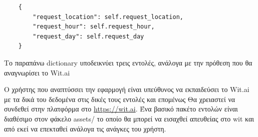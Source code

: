 \begin{lstlisting}
	{
		"request_location": self.request_location,
		"request_hour": self.request_hour,
		"request_day": self.request_day
	}
\end{lstlisting}

Το παραπάνω dictionary υποδεικνύει τρεις εντολές, ανάλογα με την πρόθεση που θα αναγνωρίσει το Wit.ai

Ο χρήστης που αναπτύσσει την εφαρμογή είναι υπεύθυνος να εκπαιδεύσει το Wit.ai με τα δικά του δεδομένα στις δικές τους εντολές και επομένως Θα χρειαστεί να συνδεθεί στην πλατφόρμα στο \href{https://wit.ai}{https://wit.ai}. Ένα βασικό πακέτο εντολών είναι διαθέσιμο στον φάκελο assets/ το οποίο θα μπορεί να εισαχθεί απευθείας στο wit και από εκεί να επεκταθεί ανάλογα τις ανάγκες του χρήστη.